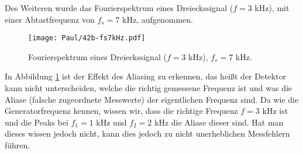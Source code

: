 \newpage
Des Weiteren wurde das Fourierspektrum eines Dreieckssignal ($f = 3$ kHz), mit einer Abtastfrequenz von $f_s = 7$ kHz, aufgenommen.
\begin{figure}[h]
    \centering
    \texttt{[image: Paul/42b-fs7kHz.pdf]}
    \caption{Fourierspektrum eines Dreieckssignal ($f = 3$ kHz), $f_s = 7$ kHz.}
    \label{fig:42a3}
\end{figure}

In Abbildung \ref{fig:42a3} ist der Effekt des Aliasing zu erkennen, das heißt der Detektor kann nicht unterscheiden, welche die richtig gemessene Frequenz ist und was die Aliase (falsche zugeordnete Messwerte) der eigentlichen Frequenz sind. Da wie die Generatorfrequenz kennen, wissen wir, dass die richtige Frequenz $f=3$ kHz ist und die Peaks bei $f_1=1$ kHz und $f_2=2$ kHz die Aliase dieser sind. Hat man dieses wissen jedoch nicht, kann dies jedoch zu nicht unerheblichen Messfehlern führen.